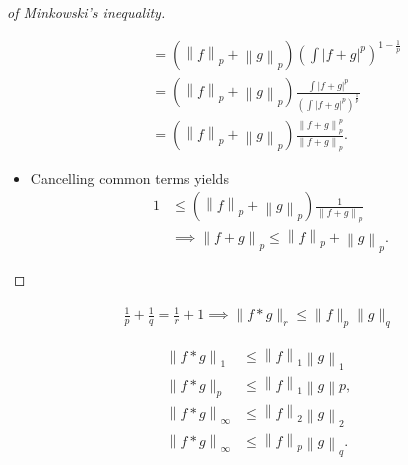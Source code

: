 \begin{proof}[of Minkowski's inequality]
\begin{itemize}
\begin{align*}
  &= \left( {\left\lVert {f} \right\rVert}_p + {\left\lVert {g} \right\rVert}_p \right) \left( \int {\left\lvert {f+g} \right\rvert}^{p} \right)^{1 - \frac 1 p} \\
  &= \left( {\left\lVert {f} \right\rVert}_p + {\left\lVert {g} \right\rVert}_p \right) \frac{\int {\left\lvert {f+g} \right\rvert}^{p} }{\left( \int {\left\lvert {f+g} \right\rvert}^{p} \right)^{\frac 1 p}} \\
  &= \left( {\left\lVert {f} \right\rVert}_p + {\left\lVert {g} \right\rVert}_p \right)  \frac{{\left\lVert {f+g} \right\rVert}_p^p}{{\left\lVert {f+g} \right\rVert}_p}
  .\end{align*}
\item
  Cancelling common terms yields
  \begin{align*}  
  1 &\leq \left( {\left\lVert {f} \right\rVert}_p + {\left\lVert {g} \right\rVert}_p \right) \frac{1}{{\left\lVert {f+g} \right\rVert}_p} \\
  &\implies 
  {\left\lVert {f+g} \right\rVert}_p
  \leq {\left\lVert {f} \right\rVert}_p + {\left\lVert {g} \right\rVert}_p 
  .\end{align*}
\end{itemize}

\end{proof}

\begin{proposition}

\begin{align*}
\frac 1 p + \frac 1 q = \frac 1 r + 1 \implies
\|f \ast g\|_{r} \leq\|f\|_{p}\|g\|_{q}
\end{align*}

\end{proposition}

\begin{remark}

\begin{align*}  
{\left\lVert {f\ast g} \right\rVert}_1      & \leq {\left\lVert {f} \right\rVert}_1 {\left\lVert {g} \right\rVert}_1 \\
\|f * g\|_{p}         & \leq {\left\lVert {f} \right\rVert}_1 {\left\lVert {g} \right\rVert}p, \\
{\left\lVert {f\ast g} \right\rVert}_\infty & \leq {\left\lVert {f} \right\rVert}_2 {\left\lVert {g} \right\rVert}_2 \\
{\left\lVert {f\ast g} \right\rVert}_\infty & \leq {\left\lVert {f} \right\rVert}_p {\left\lVert {g} \right\rVert}_q
.\end{align*}

\end{remark}

